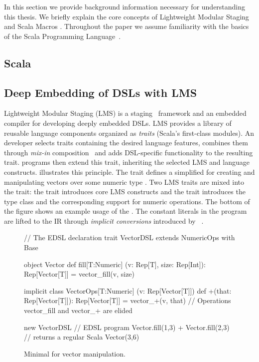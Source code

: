 In this section we provide background information necessary for understanding this
thesis. We briefly explain the core concepts of Lightweight Modular Staging
\cite{rompf2012lightweight,rompf_optimizing_2013} and Scala Macros
\cite{burmako_scala_2013}. Throughout the paper we assume familiarity with
the basics of the Scala Programming Language~\cite{odersky_scala_2004}.
\subsection{Scala}
\subsection{Deep Embedding of DSLs with LMS}
\label{subsec:deep-embedding}

Lightweight Modular Staging (LMS) is a
staging~\cite{taha_multi-stage_1997} framework and an embedded
compiler for developing deeply embedded DSLs.  LMS provides a library
of reusable language components organized as \emph{traits} (Scala's
first-class modules).  An \edsl developer selects traits containing
the desired language features, combines them through \emph{mix-in}
composition~\cite{odersky_scalable_2005} and adds DSL-specific
functionality to the resulting \edsl trait.  \edsl programs then
extend this trait, inheriting the selected LMS and \edsl language
constructs.  illustrates this principle.  The trait
 defines a simplified \edsl for creating and
manipulating vectors over some numeric type .  Two LMS traits
are mixed into the  trait: the  trait
introduces core LMS constructs %
and the  trait introduces the  type
class and the corresponding support for numeric operations.  The
bottom of the figure shows an example usage of the \edsl. The constant
literals in the program are lifted to the IR through \emph{implicit
  conversions} introduced by
~\cite{oliveira_type_2010}.

\begin{figure}
\begin{listingtiny}
// The EDSL declaration
trait VectorDSL extends NumericOps with Base {
  object Vector {
    def fill[T:Numeric]
      (v: Rep[T], size: Rep[Int]): Rep[Vector[T]] =
      vector_fill(v, size)
  }

  implicit class VectorOps[T:Numeric]
    (v: Rep[Vector[T]]) {
    def +(that: Rep[Vector[T]]): Rep[Vector[T]] =
      vector_+(v, that)
  }
  // Operations vector_fill and vector_+ are elided
}

new VectorDSL { // EDSL program
  Vector.fill(1,3) + Vector.fill(2,3)
} // returns a regular Scala Vector(3,6)
\end{listingtiny}
\caption{\label{lst:lms} Minimal \edsl for vector manipulation.}
\end{figure}

